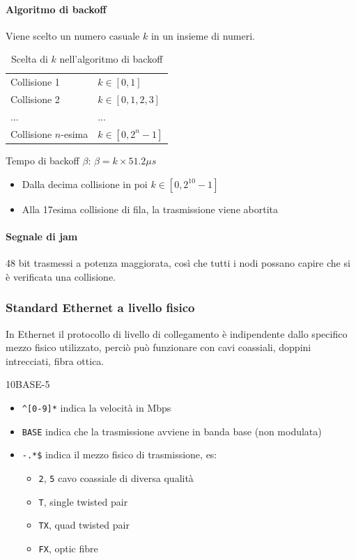 \documentclass[12pt,a4paper]{article}
\begin{document}
\paragraph{Algoritmo di backoff}

Viene scelto un numero casuale $k$ in un insieme di numeri.

\begin{table}[H]
  \centering
  \begin{tabular}{ l l }
    Collisione 1          & $ k \in [0, 1] $        \\
    Collisione 2          & $ k \in [0, 1, 2, 3] $  \\
    ...                   & ...                     \\
    Collisione $n$-esima  & $ k \in [0, 2^n - 1] $  \\
  \end{tabular}
  \caption{Scelta di $k$ nell'algoritmo di backoff}
\end{table}

Tempo di backoff $ \beta $: $ \beta = k \times 51.2 \mu s $

\begin{itemize}
  \item Dalla decima collisione in poi $ k \in [0, 2^{10} - 1] $
  \item Alla 17esima collisione di fila, la trasmissione viene abortita
\end{itemize}

\paragraph{Segnale di jam}
48 bit trasmessi a potenza maggiorata, così che tutti i nodi possano
capire che si è verificata una collisione.

\subsubsection{Standard Ethernet a livello fisico}
In Ethernet il protocollo di livello di collegamento è indipendente
dallo specifico mezzo fisico utilizzato, perciò può funzionare con cavi
coassiali, doppini intrecciati, fibra ottica.

10BASE-5
\begin{itemize}
  \item \texttt{\^{}[0-9]*} indica la velocità in Mbps
  \item \texttt{BASE} indica che la trasmissione avviene in banda base (non modulata)
  \item \texttt{-.*\$} indica il mezzo fisico di trasmissione, es:
    \begin{itemize}
      \item \texttt{2}, \texttt{5} cavo coassiale di diversa qualità
      \item \texttt{T}, single twisted pair
      \item \texttt{TX}, quad twisted pair
      \item \texttt{FX}, optic fibre
    \end{itemize}
\end{itemize}
\end{document}
